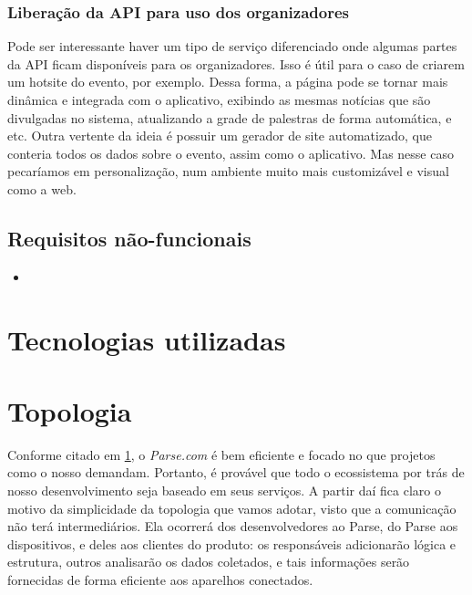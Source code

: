 \documentclass[a4paper]{abntex2}
\begin{document}
\subsubsection*{Liberação da API para uso dos organizadores}
Pode ser interessante haver um tipo de serviço diferenciado onde algumas partes da API ficam disponíveis para os organizadores. Isso é útil para o caso de criarem um hotsite do evento, por exemplo. Dessa forma, a página pode se tornar mais dinâmica e integrada com o aplicativo, exibindo as mesmas notícias que são divulgadas no sistema, atualizando a grade de palestras de forma automática, e etc.
Outra vertente da ideia é possuir um gerador de site automatizado, que conteria todos os dados sobre o evento, assim como o aplicativo. Mas nesse caso pecaríamos em personalização, num ambiente muito mais customizável e visual como a web.

\subsection{Requisitos não-funcionais}
\begin{itemize}
	\item 
\end{itemize}

\section{Tecnologias utilizadas} \label{sec:tecnologias}


\section{Topologia}
Conforme citado em \ref{sec:tecnologias}, o \emph{Parse.com} é bem eficiente e focado no que projetos como o nosso demandam. Portanto, é provável que todo o ecossistema por trás de nosso desenvolvimento seja baseado em seus serviços. A partir daí fica claro o motivo da simplicidade da topologia que vamos adotar, visto que a comunicação não terá intermediários. Ela ocorrerá dos desenvolvedores ao Parse, do Parse aos dispositivos, e deles aos clientes do produto: os responsáveis adicionarão lógica e estrutura, outros analisarão os dados coletados, e tais informações serão fornecidas de forma eficiente aos aparelhos conectados.
\end{document}
